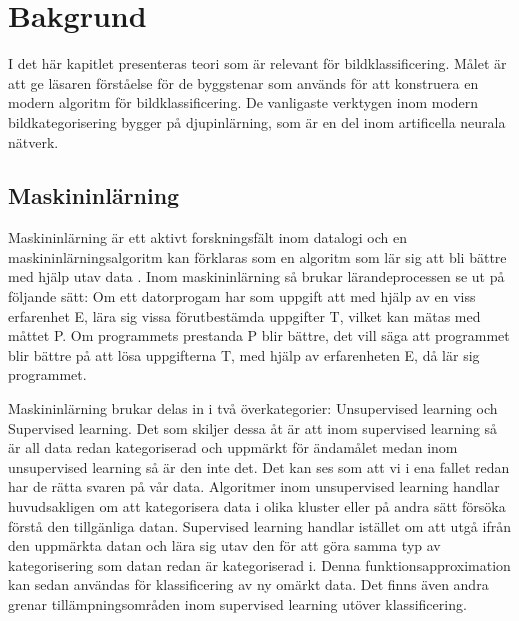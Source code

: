 \documentclass[]{kththesis}
\begin{document}
\chapter{Bakgrund}
I det här kapitlet presenteras teori som är relevant för bildklassificering. Målet är att ge läsaren förståelse för de byggstenar som används för att konstruera en modern algoritm för bildklassificering. De vanligaste verktygen inom modern bildkategorisering bygger på djupinlärning, som är en del inom
artificella neurala nätverk.

\section{Maskininlärning}
Maskininlärning är ett aktivt forskningsfält inom datalogi och en maskininlärningsalgoritm kan förklaras som en algoritm som lär sig att bli bättre med hjälp utav data \parencite{Goodfellow-et-al-2016}. Inom maskininlärning så brukar lärandeprocessen se ut på följande sätt: Om ett datorprogam har som uppgift att med hjälp av en viss erfarenhet E, lära sig vissa förutbestämda uppgifter T, vilket kan mätas med måttet P. Om programmets prestanda P blir bättre, det vill säga att programmet blir bättre på att lösa uppgifterna T, med hjälp av erfarenheten E, då lär sig programmet.

Maskininlärning brukar delas in i två överkategorier: Unsupervised learning och Supervised learning. Det som skiljer dessa åt är att inom supervised learning så är all data redan kategoriserad och uppmärkt för ändamålet medan inom unsupervised learning så är den inte det. Det kan ses som att vi i ena fallet redan har de rätta svaren på vår data. Algoritmer inom unsupervised learning handlar huvudsakligen om att kategorisera data i olika kluster eller på andra sätt försöka förstå den tillgänliga datan. Supervised learning handlar istället om att utgå ifrån den uppmärkta datan och lära sig utav den för att göra samma typ av kategorisering som datan redan är kategoriserad i. Denna funktionsapproximation kan sedan användas för klassificering av ny omärkt data. Det finns även andra grenar tillämpningsområden inom supervised learning utöver klassificering.
\end{document}
